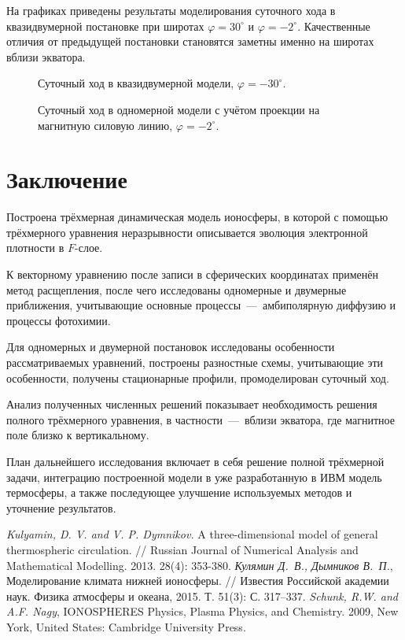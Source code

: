 \documentclass[14pt, a4paper, fleqn]{extarticle}
\begin{document}
На графиках приведены результаты моделирования суточного хода в квазидвумерной постановке при широтах $\varphi = 30^\circ$ и $\varphi = -2^\circ$. Качественные отличия от предыдущей постановки становятся заметны именно на широтах вблизи экватора. 


\begin{figure}[H]
\caption{Суточный ход в квазидвумерной модели, $\varphi = -30^\circ$.}
\end{figure}

\begin{figure}[H]
\caption{Суточный ход в одномерной модели с учётом проекции на магнитную силовую линию, $\varphi = -2^\circ$.}
\end{figure}

\newpage

\section{Заключение}

Построена трёхмерная динамическая модель ионосферы, в которой с помощью трёхмерного уравнения неразрывности описывается эволюция электронной плотности в $F$-слое.

К векторному уравнению после записи в сферических координатах применён метод расщепления, после чего исследованы одномерные и двумерные приближения, учитывающие основные процессы~---~амбиполярную диффузию и процессы фотохимии.

Для одномерных и двумерной постановок исследованы особенности рассматриваемых уравнений, построены разностные схемы, учитывающие эти особенности, получены стационарные профили, промоделирован суточный ход.

Анализ полученных численных решений показывает необходимость решения полного трёхмерного уравнения, в частности~---~вблизи экватора, где магнитное поле близко к вертикальному.

План дальнейшего исследования включает в себя решение полной трёхмерной задачи, интеграцию построенной модели в уже разработанную в ИВМ модель термосферы, а также последующее улучшение используемых методов и уточнение результатов.

\newpage
{}

\begin{thebibliography}{00}
\textit{Kulyamin, D. V. and V. P. Dymnikov.} A three-dimensional model of general thermospheric circulation. // Russian Journal of Numerical Analysis and Mathematical Modelling. 2013. 28(4): 353-380.
\textit{Кулямин Д.~В., Дымников В.~П.}, Моделирование климата нижней ионосферы. // Известия Российской академии наук. Физика атмосферы и океана, 2015. Т. 51(3): С. 317–337.
\textit{Schunk, R.W. and A.F. Nagy}, IONOSPHERES Physics, Plasma Physics, and Chemistry. 2009, New York, United States: Cambridge University Press.
\end{thebibliography}
\end{document}
